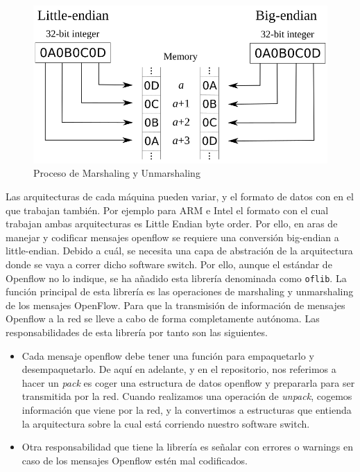 \begin{figure}[ht]
    \centering
    \includegraphics[width=\textwidth]{archivos/img/teoria/bofuss6.png}
    \caption{Proceso de Marshaling y Unmarshaling }
    \label{fig:bofuss6}
\end{figure}

Las arquitecturas de cada máquina pueden variar, y el formato de datos con en el que trabajan también. Por ejemplo para ARM e Intel el formato con el cual trabajan ambas arquitecturas es Little Endian byte order. Por ello, en aras de manejar y codificar mensajes openflow se requiere una conversión big-endian a little-endian. Debido a cuál, se necesita una capa de abstración de la arquitectura donde se vaya a correr dicho software switch. Por ello, aunque el estándar de Openflow no lo indique, se ha añadido esta librería denominada como \texttt{oflib}. La función principal de esta librería es las operaciones de  marshaling y unmarshaling de los mensajes OpenFlow. Para que la transmisión de información de mensajes Openflow a la red se lleve a cabo de forma completamente autónoma. Las responsabilidades de esta librería por tanto son las siguientes.

\begin{itemize}
    \item Cada mensaje openflow debe tener una función para empaquetarlo y desempaquetarlo. De aquí en adelante, y en el repositorio, nos referimos a hacer un \textit{pack} es coger una estructura de datos openflow y prepararla para ser transmitida por la red. Cuando realizamos una operación de \textit{unpack}, cogemos información que viene por la red, y la convertimos a estructuras que entienda la arquitectura sobre la cual está corriendo nuestro software switch.
    \item Otra responsabilidad que tiene la librería es señalar con errores o warnings en caso de los mensajes Openflow estén mal codificados.
\end{itemize}


